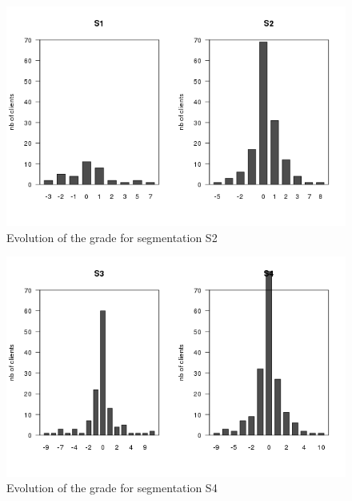 \documentclass[a4paper, 11pt]{article}
\begin{document}
    \begin{figure}[!ht]
            \centering
            \includegraphics[height = 10 cm]{Remi/Evolution_of_the_grade_for_segmentation_S2.png}
            \caption{Evolution of the grade for segmentation S2}
            \label{fig:e_seg_S2}
    \end{figure}

    \begin{figure}[!ht]
            \centering
            \includegraphics[height = 10 cm]{Remi/Evolution_of_the_grade_for_segmentation_S4.png}
            \caption{Evolution of the grade for segmentation S4}
            \label{fig:e_seg_S4}
    \end{figure}
\end{document}
